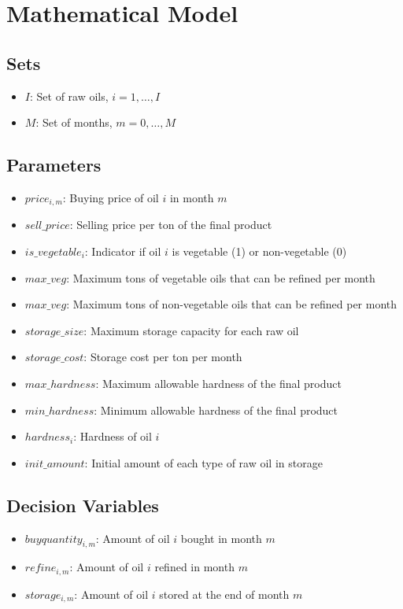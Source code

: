 \documentclass{article}
\begin{document}
\section*{Mathematical Model}

\subsection*{Sets}
\begin{itemize}
    \item \( I \): Set of raw oils, \( i = 1, \ldots, I \)
    \item \( M \): Set of months, \( m = 0, \ldots, M \)
\end{itemize}

\subsection*{Parameters}
\begin{itemize}
    \item \( price_{i,m} \): Buying price of oil \( i \) in month \( m \)
    \item \( sell\_price \): Selling price per ton of the final product
    \item \( is\_vegetable_{i} \): Indicator if oil \( i \) is vegetable (1) or non-vegetable (0)
    \item \( max\_veg \): Maximum tons of vegetable oils that can be refined per month
    \item \( max\_veg \): Maximum tons of non-vegetable oils that can be refined per month
    \item \( storage\_size \): Maximum storage capacity for each raw oil
    \item \( storage\_cost \): Storage cost per ton per month
    \item \( max\_hardness \): Maximum allowable hardness of the final product
    \item \( min\_hardness \): Minimum allowable hardness of the final product
    \item \( hardness_{i} \): Hardness of oil \( i \)
    \item \( init\_amount \): Initial amount of each type of raw oil in storage
\end{itemize}

\subsection*{Decision Variables}
\begin{itemize}
    \item \( buyquantity_{i,m} \): Amount of oil \( i \) bought in month \( m \)
    \item \( refine_{i,m} \): Amount of oil \( i \) refined in month \( m \)
    \item \( storage_{i,m} \): Amount of oil \( i \) stored at the end of month \( m \)
\end{itemize}
\end{document}
